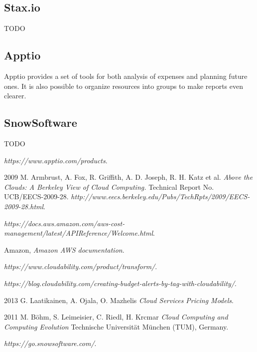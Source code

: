 \documentclass[licencjacka,en]{thesisclass}
\begin{document}
	\subsection{Stax.io}

	TODO

	\subsection{Apptio}

	Apptio provides a set of tools for both analysis of expenses and planning future ones. It
	is also possible to organize resources into groups to make reports even clearer.

	\subsection{SnowSoftware}

	TODO


    
\begin{thebibliography}{99}

    \textit{https://www.apptio.com/products}.

    2009 M. Armbrust, A. Fox, R. Griffith, A. D. Joseph, R. H. Katz et al.
    \textit{Above the Clouds: A Berkeley View of Cloud Computing.} 
    Technical Report No. UCB/EECS-2009-28.
    \textit{http://www.eecs.berkeley.edu/Pubs/TechRpts/2009/EECS-2009-28.html}.

    \textit{https://docs.aws.amazon.com/aws-cost-management/latest/APIReference/Welcome.html}.

    Amazon,
    \textit{Amazon AWS documentation}. 

    \textit{https://www.cloudability.com/product/transform/}.

    \textit{https://blog.cloudability.com/creating-budget-alerts-by-tag-with-cloudability/}.
        
    2013 G. Laatikainen, A. Ojala, O. Mazhelis
    \textit{Cloud Services Pricing Models}.

    2011 M. Böhm, S. Leimeisier, C. Riedl, H. Krcmar
    \textit{Cloud Computing and Computing Evolution}
    Technische Universität München (TUM), Germany.

    \textit{https://go.snowsoftware.com/}.

\end{thebibliography}
\end{document}
